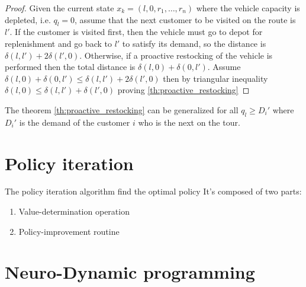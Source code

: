 \begin{proof}
Given the current state $x_k=(l,0,r_1,\ldots, r_n)$ where the vehicle capacity is depleted, i.e. $q_l = 0$, assume that the next customer to be visited on the route is $l'$. If the customer is visited first, then the vehicle must go to depot for replenishment and go back to $l'$ to satisfy its demand, so the distance is $\delta(l,l')+2\delta(l',0)$. Otherwise, if a proactive restocking of the vehicle is performed then the total distance is $\delta(l,0)+\delta(0,l')$.
Assume $\delta(l,0)+\delta(0,l') \leq \delta(l,l')+2\delta(l',0)$ then by triangular inequality $\delta(l,0) \leq \delta(l,l')+\delta(l',0)$ proving \ref{th:proactive_restocking}
\end{proof}

\begin{lemma}%
 The theorem \ref{th:proactive_restocking} can be generalized for all $q_l \geq D_i'$ where $D_i'$ is the demand of the customer $i$ who is the next on the tour.
\end{lemma}











\section{Policy iteration}

The policy iteration algorithm find the optimal policy
It's composed of two parts:
\begin{enumerate}
 \item Value-determination operation
 \item Policy-improvement routine
\end{enumerate}


\section{Neuro-Dynamic programming}


